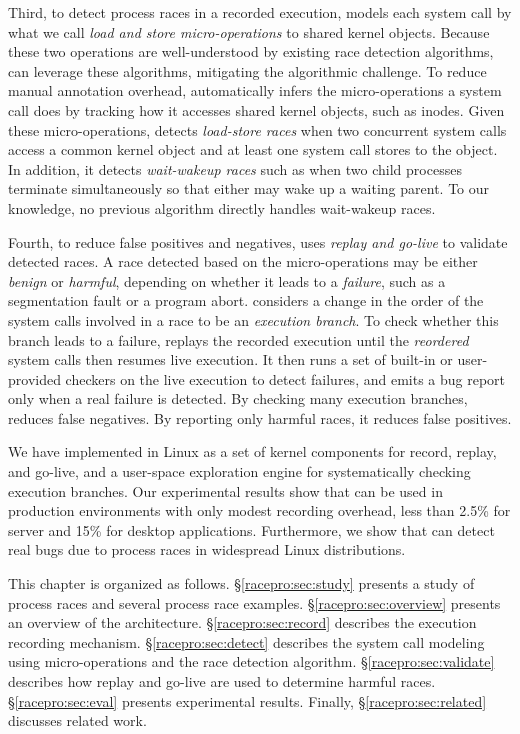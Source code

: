Third, to detect process races in a recorded execution,
\racepro models each system call by what we call
\emph{load and store micro-operations} to shared kernel objects. 
Because these two operations are well-understood by existing race
detection algorithms, \racepro can leverage these
algorithms, mitigating the algorithmic challenge.  To reduce manual
annotation overhead, \racepro automatically infers
the micro-operations a system call does by tracking how it
accesses shared kernel objects, such as inodes.  
Given these micro-operations, \racepro detects \emph{load-store
races} when two concurrent system calls access a common kernel object
and at least one system call stores to the object.
In addition, it detects \emph{wait-wakeup races} such as
when two child processes terminate simultaneously 
so that either may wake up a waiting parent.
To our knowledge, no previous algorithm directly handles wait-wakeup races.

Fourth, to reduce false positives and negatives, \racepro uses 
\emph{replay and go-live} to validate detected races.
A race detected based on the micro-operations may be either \emph{benign}
or \emph{harmful}, depending on whether it leads to a \emph{failure}, such
as a segmentation fault or a program abort.
\racepro considers a change in the order of the system
calls involved in a race to be an \emph{execution branch}.  To check
whether this branch leads 
to a failure, \racepro replays the recorded execution until the \emph{reordered}
system calls then resumes live execution.  It then runs a set of built-in or
user-provided checkers on the live execution to detect failures,
and emits a bug report only when a real failure is detected.
By checking many execution branches,
\racepro reduces false negatives.  By reporting only harmful races, it
reduces false positives. 

We have implemented \racepro in Linux as a set of kernel components for
record, replay, and go-live, and a user-space exploration engine for
systematically checking execution branches.  Our experimental results
show that \racepro can be used in production environments with only
modest recording overhead, less than 2.5\% for server and 15\% for
desktop applications.  Furthermore, we show that \racepro can detect
\nracepro real bugs due to process races in widespread Linux
distributions. 

This chapter is organized as follows.  \S\ref{racepro:sec:study} presents a
study of process races and several process race examples.
\S\ref{racepro:sec:overview} presents an overview of the \racepro architecture.
\S\ref{racepro:sec:record} describes the execution recording mechanism.
\S\ref{racepro:sec:detect} describes  the system call modeling using
micro-operations and the race detection algorithm.
\S\ref{racepro:sec:validate} describes how replay and go-live are used to
determine harmful races.  \S\ref{racepro:sec:eval} presents experimental
results. Finally,  \S\ref{racepro:sec:related} discusses related work.

